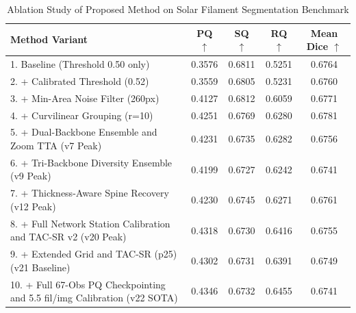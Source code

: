 \begin{table}[h!]
\centering
\caption{Ablation Study of Proposed Method on Solar Filament Segmentation Benchmark}
\label{tab:ablation}
\begin{tabular}{lcccc}
\hline
\textbf{Method Variant} & \textbf{PQ $\uparrow$} & \textbf{SQ $\uparrow$} & \textbf{RQ $\uparrow$} & \textbf{Mean Dice $\uparrow$} \\
\hline
1. Baseline (Threshold 0.50 only) & 0.3576 & 0.6811 & 0.5251 & 0.6764 \\
2. + Calibrated Threshold (0.52) & 0.3559 & 0.6805 & 0.5231 & 0.6760 \\
3. + Min-Area Noise Filter (260px) & 0.4127 & 0.6812 & 0.6059 & 0.6771 \\
4. + Curvilinear Grouping (r=10) & 0.4251 & 0.6769 & 0.6280 & 0.6781 \\
5. + Dual-Backbone Ensemble and Zoom TTA (v7 Peak) & 0.4231 & 0.6735 & 0.6282 & 0.6756 \\
6. + Tri-Backbone Diversity Ensemble (v9 Peak) & 0.4199 & 0.6727 & 0.6242 & 0.6741 \\
7. + Thickness-Aware Spine Recovery (v12 Peak) & 0.4230 & 0.6745 & 0.6271 & 0.6761 \\
8. + Full Network Station Calibration and TAC-SR v2 (v20 Peak) & 0.4318 & 0.6730 & 0.6416 & 0.6755 \\
9. + Extended Grid and TAC-SR (p25) (v21 Baseline) & 0.4302 & 0.6731 & 0.6391 & 0.6749 \\
10. + Full 67-Obs PQ Checkpointing and 5.5 fil/img Calibration (v22 SOTA) & 0.4346 & 0.6732 & 0.6455 & 0.6741 \\
\hline
\end{tabular}
\end{table}
